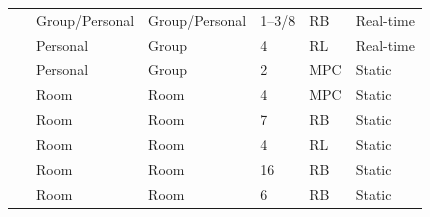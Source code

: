 \begin{tabular}{@{}p{3.50cm}M{2.25cm}M{2.25cm}M{1.55cm}M{1.55cm}M{1.55cm}@{}}
\toprule
{} &  &  &  &  &  \\
\midrule
{}~\cite{ono_impact_2022} & Group/Personal & Group/Personal & 1--3/8 & RB & Real-time \\
~\cite{lei_practical_2022} & Personal & Group & 4 & RL & Real-time  \\
~\cite{lee_implementation_2019} & Personal & Group & 2 & MPC & Static \\
~\cite{li_indoor_2019} & Room & Room & 4 & MPC & Static \\
~\cite{li_personalized_2017} & Room & Room & 7 & RB & Static \\
~\cite{li_indoor_2023} & Room & Room & 4 & RL & Static \\
~\cite{aguilera_thermal_2019} & Room & Room & 16 & RB & Static \\
~\cite{li_experimental_2021} & Room & Room & 6 & RB & Static \\
\bottomrule
\end{tabular}

